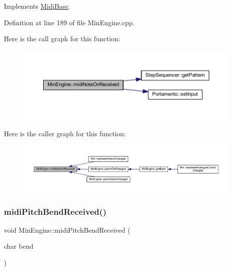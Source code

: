 Implements \hyperlink{class_midi_base_aa977f9f3db59b0a8b892ee28bcf93695}{Midi\+Base}.



Definition at line 189 of file Min\+Engine.\+cpp.

Here is the call graph for this function\+:
\nopagebreak
\begin{figure}[H]
\begin{center}
\leavevmode
\includegraphics[width=350pt]{d4/d0f/class_min_engine_a108d70cfac8c363fbf6445f679dcf4d5_cgraph}
\end{center}
\end{figure}
Here is the caller graph for this function\+:
\nopagebreak
\begin{figure}[H]
\begin{center}
\leavevmode
\includegraphics[width=350pt]{d4/d0f/class_min_engine_a108d70cfac8c363fbf6445f679dcf4d5_icgraph}
\end{center}
\end{figure}
\mbox{\label{class_min_engine_a5b0f6a252cc4958e81d8989872105544}} 
\subsubsection{\texorpdfstring{midi\+Pitch\+Bend\+Received()}{midiPitchBendReceived()}}
{\footnotesize\ttfamily void Min\+Engine\+::midi\+Pitch\+Bend\+Received (\begin{DoxyParamCaption}\item[{char}]{bend }\end{DoxyParamCaption})\hspace{0.3cm}{\ttfamily [virtual]}}



